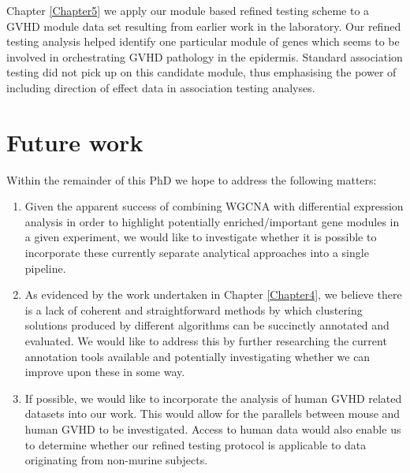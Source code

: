 Chapter \ref{Chapter5} we apply our module based refined testing scheme to a GVHD module data set resulting from earlier work in the laboratory. Our refined testing analysis helped identify one particular module of genes which seems to be involved in orchestrating GVHD pathology in the epidermis. Standard association testing did not pick up on this candidate module, thus emphasising the power of including direction of effect data in association testing analyses.

\section{Future work}

Within the remainder of this PhD we hope to address the following matters: 

\begin{enumerate}
    \item Given the apparent success of combining WGCNA with differential expression analysis in order to highlight potentially enriched/important gene modules in a given experiment, we would like to investigate whether it is possible to incorporate these currently separate analytical approaches into a single pipeline.
    \item As evidenced by the work undertaken in Chapter \ref{Chapter4}, we believe there is a lack of coherent and straightforward methods by which clustering solutions produced by different algorithms can be succinctly annotated and evaluated. We would like to address this by further researching the current annotation tools available and potentially investigating whether we can improve upon these in some way.
    \item If possible, we would like to incorporate the analysis of human GVHD related datasets into our work. This would allow for the parallels between mouse and human GVHD to be investigated. Access to human data would also enable us to determine whether our refined testing protocol is applicable to data originating from non-murine subjects.
\end{enumerate}